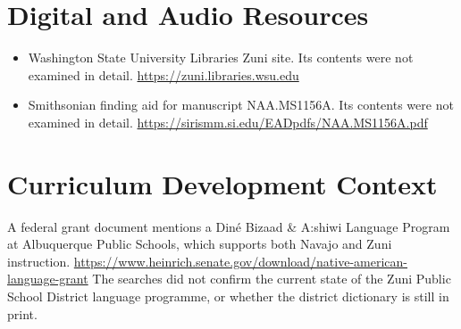 \documentclass[12pt]{article}
\begin{document}
\section{Digital and Audio Resources}
\begin{itemize}
\item Washington State University Libraries Zuni site. Its contents were not examined in detail. \url{https://zuni.libraries.wsu.edu}
\item Smithsonian finding aid for manuscript NAA.MS1156A. Its contents were not examined in detail. \url{https://sirismm.si.edu/EADpdfs/NAA.MS1156A.pdf}
\end{itemize}

\section{Curriculum Development Context}
A federal grant document mentions a Din\'e Bizaad \& A:shiwi Language Program at Albuquerque Public Schools, which supports both Navajo and Zuni instruction. \url{https://www.heinrich.senate.gov/download/native-american-language-grant} The searches did not confirm the current state of the Zuni Public School District language programme, or whether the district dictionary is still in print.
\end{document}
